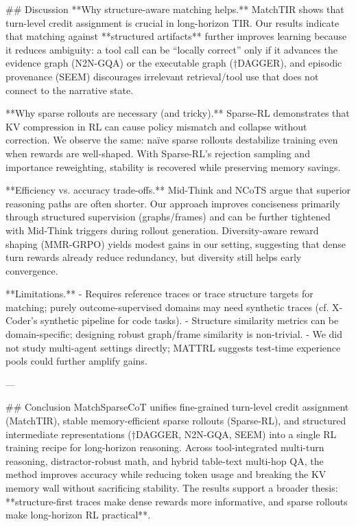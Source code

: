 ## Discussion
**Why structure-aware matching helps.** MatchTIR shows that turn-level credit assignment is crucial in long-horizon TIR. Our results indicate that matching against **structured artifacts** further improves learning because it reduces ambiguity: a tool call can be “locally correct” only if it advances the evidence graph (N2N-GQA) or the executable graph (†DAGGER), and episodic provenance (SEEM) discourages irrelevant retrieval/tool use that does not connect to the narrative state.

**Why sparse rollouts are necessary (and tricky).** Sparse-RL demonstrates that KV compression in RL can cause policy mismatch and collapse without correction. We observe the same: naïve sparse rollouts destabilize training even when rewards are well-shaped. With Sparse-RL’s rejection sampling and importance reweighting, stability is recovered while preserving memory savings.

**Efficiency vs. accuracy trade-offs.** Mid-Think and NCoTS argue that superior reasoning paths are often shorter. Our approach improves conciseness primarily through structured supervision (graphs/frames) and can be further tightened with Mid-Think triggers during rollout generation. Diversity-aware reward shaping (MMR-GRPO) yields modest gains in our setting, suggesting that dense turn rewards already reduce redundancy, but diversity still helps early convergence.

**Limitations.**
- Requires reference traces or trace structure targets for matching; purely outcome-supervised domains may need synthetic traces (cf. X-Coder’s synthetic pipeline for code tasks).
- Structure similarity metrics can be domain-specific; designing robust graph/frame similarity is non-trivial.
- We did not study multi-agent settings directly; MATTRL suggests test-time experience pools could further amplify gains.

---

## Conclusion
MatchSparseCoT unifies fine-grained turn-level credit assignment (MatchTIR), stable memory-efficient sparse rollouts (Sparse-RL), and structured intermediate representations (†DAGGER, N2N-GQA, SEEM) into a single RL training recipe for long-horizon reasoning. Across tool-integrated multi-turn reasoning, distractor-robust math, and hybrid table-text multi-hop QA, the method improves accuracy while reducing token usage and breaking the KV memory wall without sacrificing stability. The results support a broader thesis: **structure-first traces make dense rewards more informative, and sparse rollouts make long-horizon RL practical**.

